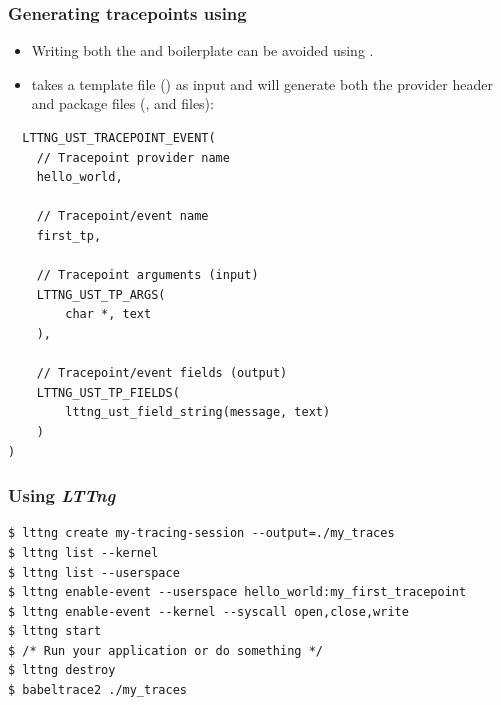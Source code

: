 \begin{frame}[fragile]
  \frametitle{Generating tracepoints using }
  \begin{itemize}
    \item Writing both the  and  boilerplate can be avoided
          using .
    \item {} takes a template file () as input and will
          generate both the provider header and package files (,
           and  files):
  \end{itemize}
  \begin{block}{}
    \begin{verbatim}
  LTTNG_UST_TRACEPOINT_EVENT(
    // Tracepoint provider name
    hello_world,

    // Tracepoint/event name
    first_tp,

    // Tracepoint arguments (input)
    LTTNG_UST_TP_ARGS(
        char *, text
    ),

    // Tracepoint/event fields (output)
    LTTNG_UST_TP_FIELDS(
        lttng_ust_field_string(message, text)
    )
)
   \end{verbatim}
  \end{block}
\end{frame}

\begin{frame}[fragile]
  \frametitle{Using {\em LTTng}}
  \begin{block}{}
    \begin{verbatim}
$ lttng create my-tracing-session --output=./my_traces
$ lttng list --kernel
$ lttng list --userspace
$ lttng enable-event --userspace hello_world:my_first_tracepoint
$ lttng enable-event --kernel --syscall open,close,write
$ lttng start
$ /* Run your application or do something */
$ lttng destroy
$ babeltrace2 ./my_traces
   \end{verbatim}
  \end{block}
\end{frame}

